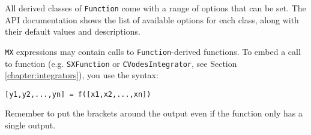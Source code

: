 \documentclass[a4paper,12pt]{book}
\newcommand{\n}{\\n}
\newcounter{pytexcount}
\newcounter{pytexsubcount}
\renewenvironment{pytex}
{\addtocounter{pytexsubcount}{1}%
\begin{rawhtml}
<div style="color: black; background-color: \#b9c8db;  border-style: dotted; border-width: 1px; padding:2px;padding-left:1em" >
<pre>
\end{rawhtml}
}%
{\begin{rawhtml}
</pre>
</div>
<div style="color: black; background-color: \#fffff;  border-style: solid; border-width: 1px; padding:2px;padding-left:1em;margin-left:1em;" >\end{rawhtml}%
\verbatiminputeval{pytex_\alph{pytexcount}_\arabic{pytexsubcount}.log}%
\begin{rawhtml}
</div>
\end{rawhtml}
}
\renewenvironment{pytexoutput}
{\addtocounter{pytexsubcount}{1}%
\begin{rawhtml}
<div style="display:none">
<pre>
\end{rawhtml}
}%
{\begin{rawhtml}
</pre>
</div>
<div style="color: black; background-color: \#fffff;  border-style: solid; border-width: 1px; padding:2px;padding-left:1em;margin-left:1em;" >\end{rawhtml}%
\verbatiminputeval{pytex_\alph{pytexcount}_\arabic{pytexsubcount}.log}%
\begin{rawhtml}
</div>
\end{rawhtml}
}
\begin{document}



All derived classes of \texttt{Function} come with a range of options that can be set. The API documentation shows the list of available options for each class, along with their default values and descriptions.



\texttt{MX} expressions may contain calls to \texttt{Function}-derived functions. To embed a call to function (e.g. \texttt{SXFunction} or \texttt{CVodesIntegrator}, see Section \ref{chapter:integrators}), you use the syntax:
\begin{verbatim}
[y1,y2,...,yn] = f([x1,x2,...,xn])
\end{verbatim}

Remember to put the brackets around the output even if the function only has a single output.
\end{document}

